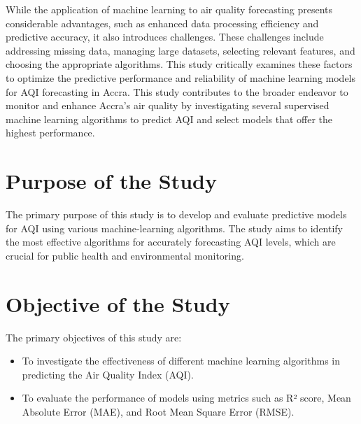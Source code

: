 \documentclass{book}
\numberwithin{equation}{section}
\numberwithin{figure}{section}
\begin{document}
While the application of machine learning to air quality forecasting presents considerable advantages, such as enhanced data processing efficiency and predictive accuracy, it also introduces challenges. These challenges include addressing missing data, managing large datasets, selecting relevant features, and choosing the appropriate algorithms. This study critically examines these factors to optimize the predictive performance and reliability of machine learning models for AQI forecasting in Accra. This study contributes to the broader endeavor to monitor and enhance Accra's air quality by investigating several supervised machine learning algorithms to predict AQI and select models that offer the highest performance.
\vspace{-5mm} %
\section{Purpose of the Study}
\label{purpose}
\vspace{-5mm} %
The primary purpose of this study is to develop and evaluate predictive models for AQI using various machine-learning algorithms. The study aims to identify the most effective algorithms for accurately forecasting AQI levels, which are crucial for public health and environmental monitoring.
\vspace{-5mm} %
\section{Objective of the Study}
\label{objective}
\vspace{-5mm} %
The primary objectives of this study are:
\begin{itemize}
    \item To investigate the effectiveness of different machine learning algorithms in predicting the Air Quality Index (AQI).
    \item To evaluate the performance of models using metrics such as R² score, Mean Absolute Error (MAE), and Root Mean Square Error (RMSE).
\end{itemize}
\vspace{-5mm} %
\end{document}
